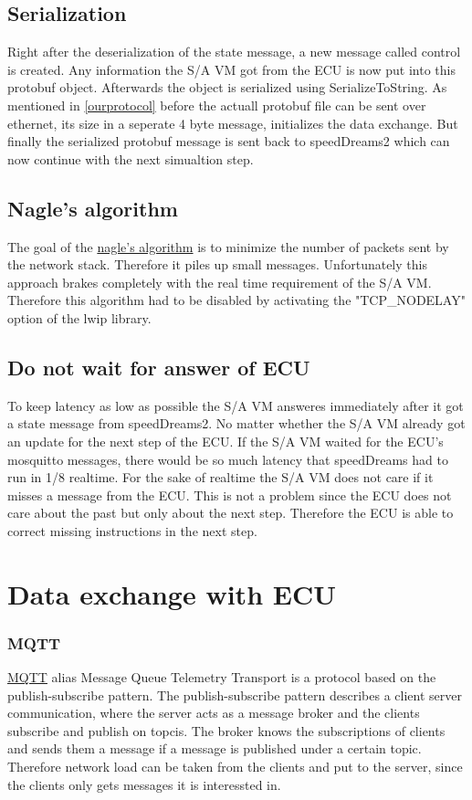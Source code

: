 \documentclass[paper=a4, fontsize=11pt]{scrreprt}
\begin{document}
  \subsection{Serialization}
Right after the deserialization of the state message, a new message called control is created. Any information the S/A VM got from the ECU is now put into this protobuf object. Afterwards the object is serialized using SerializeToString. As mentioned in \ref{ourprotocol} before the actuall protobuf file can be sent over ethernet, its size in a seperate 4 byte message, initializes the data exchange. But finally the serialized protobuf message is sent back to speedDreams2 which can now continue with the next simualtion step.
  \subsection{Nagle's algorithm}
The goal of the \href{https://www.lifewire.com/nagle-algorithm-for-tcp-network-communication-817932}{nagle's algorithm} is to minimize the number of packets sent by the network stack. Therefore it piles up small messages. Unfortunately this approach brakes completely with the real time requirement of the S/A VM. Therefore this algorithm had to be disabled by activating the "TCP\_NODELAY" option of the lwip library.
  \subsection{Do not wait for answer of ECU}
To keep latency as low as possible the S/A VM answeres immediately after it got a state message from speedDreams2. No matter whether the S/A VM already got an update for the next step of the ECU. If the S/A VM waited for the ECU's mosquitto messages, there would be so much latency that speedDreams had to run in 1/8 realtime. For the sake of realtime the S/A VM does not care if it misses a message from the ECU. This is not a problem since the ECU does not care about the past but only about the next step. Therefore the ECU is able to correct missing instructions in the next step.

\section{Data exchange with ECU}
  \subsubsection{MQTT}
\href{http://mqtt.org/}{MQTT} alias Message Queue Telemetry Transport is a protocol based on the publish-subscribe pattern.\newline
The publish-subscribe pattern describes a client server communication, where the server acts as a message broker and the clients subscribe and publish on topcis. The broker knows the subscriptions of clients and sends them a message if a message is published under a certain topic. Therefore network load can be taken from the clients and put to the server, since the clients only gets messages it is interessted in.
\end{document}
